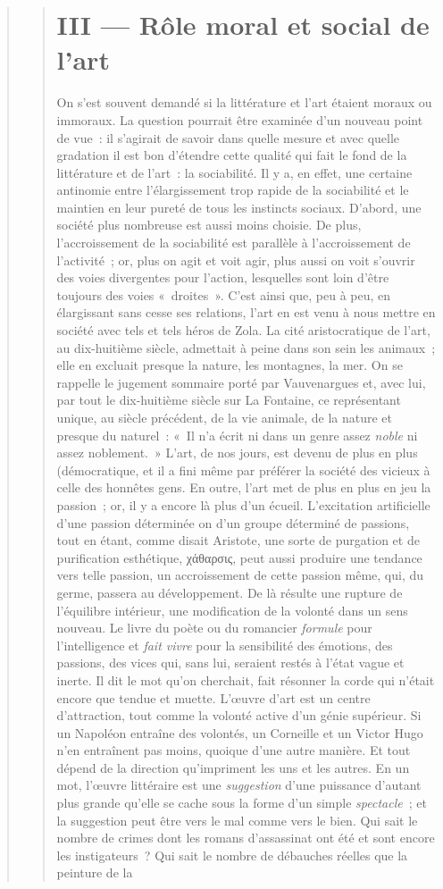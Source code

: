 \documentclass[french,twoside]{book} %
\begin{document}
\begin{verse}
\begin{verse}
\section[{III — Rôle moral et social de l’art}]{III — Rôle moral et social de l’art}
\noindent On s’est souvent demandé si la littérature et l’art étaient moraux ou immoraux. La question pourrait être examinée d’un nouveau point de vue : il s’agirait de savoir dans quelle mesure et avec quelle gradation il est bon d’étendre cette qualité qui fait le fond de la littérature et de l’art : la sociabilité. Il y a, en effet, une certaine antinomie entre l’élargissement trop rapide de la sociabilité et le maintien en leur pureté de tous les instincts sociaux. D’abord, une société plus nombreuse est aussi moins choisie. De plus, l’accroissement de la sociabilité est parallèle à l’accroissement de l’activité ; or, plus on agit et voit agir, plus aussi on voit s’ouvrir des voies divergentes pour l’action, lesquelles sont loin d’être toujours des voies « droites ». C’est ainsi que, peu à peu, en élargissant sans cesse ses relations, l’art en est venu à nous mettre en société avec tels et tels héros de Zola. La cité aristocratique de l’art, au dix-huitième siècle, admettait à peine dans son sein les animaux ; elle en excluait presque la nature, les montagnes, la mer. On se rappelle le jugement sommaire porté par Vauvenargues et, avec lui, par tout le dix-huitième siècle sur La Fontaine, ce représentant unique, au siècle précédent, de la vie animale, de la nature et presque du naturel : « Il n’a écrit ni dans un genre assez \emph{noble} ni assez noblement. » L’art, de nos jours, est devenu de plus en plus (démocratique, et il a fini même par préférer la société des vicieux à celle des honnêtes gens. En outre, l’art met de plus en plus en jeu la passion ; or, il y a encore là plus d’un écueil. L’excitation artificielle d’une passion déterminée on d’un groupe déterminé de passions, tout en étant, comme disait Aristote, une sorte de purgation et de purification esthétique, χάθαρσις, peut aussi produire une tendance vers telle passion, un accroissement de cette passion même, qui, du germe, passera au développement. De là résulte une rupture de l’équilibre intérieur, une modification de la volonté dans un sens nouveau. Le livre du poète ou du romancier \emph{formule} pour l’intelligence et \emph{fait vivre} pour la sensibilité des émotions, des passions, des vices qui, sans lui, seraient restés à l’état vague et inerte. Il dit le mot qu’on cherchait, fait résonner la corde qui n’était encore que tendue et muette. L’œuvre d’art est un centre d’attraction, tout comme la volonté active d’un génie supérieur. Si un Napoléon entraîne des volontés, un Corneille et un Victor Hugo n’en entraînent pas moins, quoique d’une autre manière. Et tout dépend de la direction qu’impriment les uns et les autres. En un mot, l’œuvre littéraire est une \emph{suggestion} d’une puissance d’autant plus grande qu’elle se cache sous la forme d’un simple \emph{spectacle} ; et la suggestion peut être vers le mal comme vers le bien. Qui sait le nombre de crimes dont les romans d’assassinat ont été et sont encore les instigateurs ? Qui sait le nombre de débauches réelles que la peinture de la 
\end{verse}
\end{verse}
\end{document}
